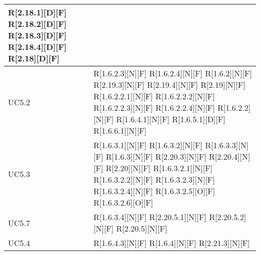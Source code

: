 \begin{longtable}{X | X}
R[2.18.1][D][F] \newline
R[2.18.2][D][F] \newline
R[2.18.3][D][F] \newline
R[2.18.4][D][F] \newline
R[2.18][D][F]  \\
\hline
UC5.2 & R[1.6.2.3][N][F] \newline
R[1.6.2.4][N][F] \newline
R[1.6.2][N][F] \newline
R[2.19.3][N][F] \newline
R[2.19.4][N][F] \newline
R[2.19][N][F] \newline
R[1.6.2.2.1][N][F] \newline
R[1.6.2.2.2][N][F] \newline
R[1.6.2.2.3][N][F] \newline
R[1.6.2.2.4][N][F] \newline
R[1.6.2.2][N][F] \newline
R[1.6.4.1][N][F] \newline
R[1.6.5.1][D][F] \newline
R[1.6.6.1][N][F]  \\
\hline
UC5.3 & R[1.6.3.1][N][F] \newline
R[1.6.3.2][N][F] \newline
R[1.6.3.3][N][F] \newline
R[1.6.3][N][F] \newline
R[2.20.3][N][F] \newline
R[2.20.4][N][F] \newline
R[2.20][N][F] \newline
R[1.6.3.2.1][N][F] \newline
R[1.6.3.2.2][N][F] \newline
R[1.6.3.2.3][N][F] \newline
R[1.6.3.2.4][N][F] \newline
R[1.6.3.2.5][O][F] \newline
R[1.6.3.2.6][O][F]  \\
\hline
UC5.7 & R[1.6.3.4][N][F] \newline
R[2.20.5.1][N][F] \newline
R[2.20.5.2][N][F] \newline
R[2.20.5][N][F]  \\
\hline
UC5.4 & R[1.6.4.3][N][F] \newline
R[1.6.4][N][F] \newline
R[2.21.3][N][F] \newline

\end{longtable}
